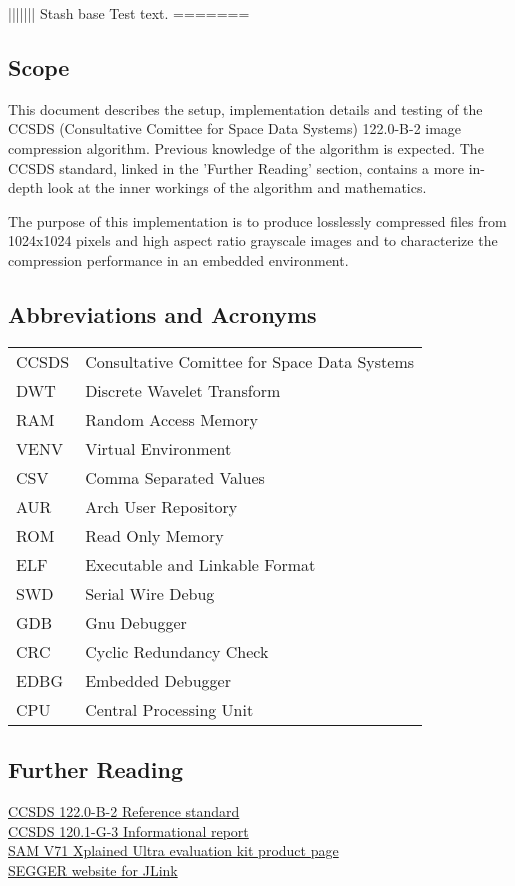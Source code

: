 \documentclass[12pt, a4paper]{article}
\begin{document}
\newpage
||||||| Stash base
Test text\cite{test}.
=======
\subsection{Scope}
This document describes the setup, implementation details and testing of the 
CCSDS (Consultative Comittee for Space Data Systems) 122.0-B-2 image compression algorithm. 
Previous knowledge of the algorithm is expected. 
The CCSDS standard, linked in the 'Further Reading' section, 
contains a more in-depth look at the inner workings of the algorithm and mathematics.

\medskip
\noindent
The purpose of this implementation is to produce losslessly compressed files from 
1024x1024 pixels and high aspect ratio grayscale images and to characterize the compression performance in an embedded environment. 

\subsection{Abbreviations and Acronyms}
\begin{tabular}{ll}
    CCSDS   & Consultative Comittee for Space Data Systems \\
    DWT     & Discrete Wavelet Transform \\
    RAM     & Random Access Memory \\
    VENV    & Virtual Environment \\
    CSV     & Comma Separated Values \\
    AUR     & Arch User Repository \\
    ROM     & Read Only Memory \\
    ELF     & Executable and Linkable Format \\
    SWD     & Serial Wire Debug \\
    GDB     & Gnu Debugger \\
    CRC     & Cyclic Redundancy Check \\
    EDBG    & Embedded Debugger \\
    CPU     & Central Processing Unit \\
\end{tabular}
\subsection{Further Reading}
\label{links}
\href{https://public.ccsds.org/Pubs/122x0b2.pdf}{CCSDS 122.0-B-2 Reference standard} \\
\href{https://public.ccsds.org/Pubs/120x1g3.pdf}{CCSDS 120.1-G-3 Informational report} \\
\href{https://www.microchip.com/en-us/development-tool/atsamv71-xult}{SAM V71 Xplained Ultra evaluation kit product page} \\
\href{https://www.segger.com/downloads/jlink/}{SEGGER website for JLink}
\end{document}
